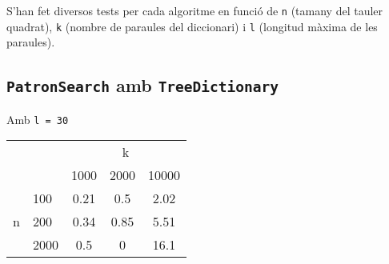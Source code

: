 \documentclass{article}
\begin{document}
S'han fet diversos tests per cada algoritme en funció de \verb|n| (tamany del tauler quadrat), \verb|k| (nombre de paraules del diccionari) i \verb|l| (longitud màxima de les paraules).

\subsection{\texttt{PatronSearch} amb \texttt{TreeDictionary}}

Amb \verb|l = 30|

\begin{tabular}{cl||c|c|c}
	\multicolumn{2}{c}{ } & \multicolumn{3}{c}{k} \\
	 & & 1000 & 2000 & 10000 \\
	\cline{2-5}
	\multirow{3}{*}{n} 
	& 100 & 0.21 & 0.5 & 2.02 \\
	& 200 & 0.34 & 0.85 & 5.51 \\
	& 2000 & 0.5 & 0 & 16.1 \\
\end{tabular}
\end{document}

